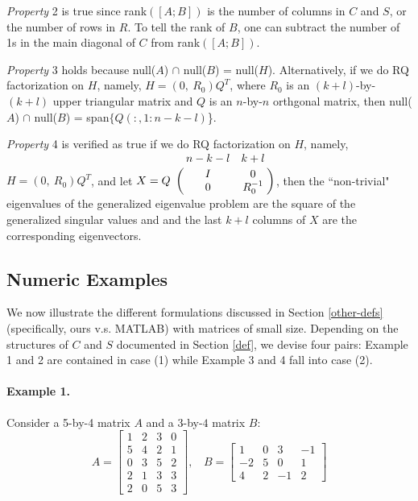             \textit{Property} 2 is true since rank$([A; B])$ is the number of columns in $C$ and $S$, or the number of rows in $R$. To tell the rank of $B$, one can subtract the number of 1s in the main diagonal of $C$ from rank$([A; B])$.
            
            \textit{Property} 3 holds because null($A$) $\cap$ null($B$) = null($H$). Alternatively, if we do RQ factorization on $H$, namely, $H = (0, \ R_0)Q^T$, where $R_0$ is an $(k+l)$-by-$(k+l)$ upper triangular matrix and $Q$ is an $n$-by-$n$ orthgonal matrix, then null($A$) $\cap$ null($B$) = span$\{Q(:,1:n-k-l)$\}.
            
            \textit{Property} 4 is verified as true if we do RQ factorization on $H$, namely, $H = (0, \ R_0)Q^T$, and let $X = Q\bordermatrix{ & n-k-l & k+l   \cr
                       \hfill & I & 0 \cr
                       \hfill & 0 & R_0^{-1} }$, then
            the  ``non-trivial" eigenvalues of the generalized eigenvalue problem are the square of the generalized singular values and and the last $k+l$ columns of $X$ are the corresponding eigenvectors.  

    \subsection{Numeric Examples}
    We now illustrate the different formulations discussed in Section \ref{other-defs} (specifically, ours v.s. MATLAB) with matrices of small size. Depending on the structures of $C$ and $S$ documented in Section \ref{def}, we devise four pairs: Example 1 and 2 are contained in case (1) while Example 3 and 4 fall into case (2).   
        
    \paragraph{Example 1.} Consider a 5-by-4 matrix $A$ and a $3$-by-$4$ matrix $B$:
    \begin{equation*}
        A = \begin{bmatrix}
            1 & 2 & 3 & 0\\
            5 & 4 & 2 & 1\\
            0 & 3 & 5 & 2\\
            2 & 1 & 3 & 3\\
            2 & 0 & 5 & 3
        \end{bmatrix}, \ \ \ \
        B = \begin{bmatrix}
            1 & 0 & 3 & -1 \\
            -2 & 5 & 0 & 1 \\
            4 & 2 & -1 & 2
        \end{bmatrix}
    \end{equation*}
        
